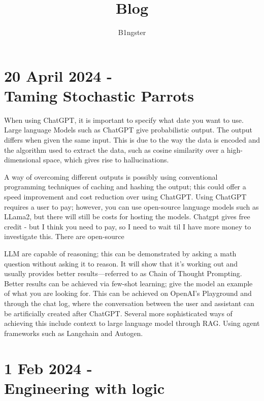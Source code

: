 \documentclass{article}
\title{Blog}
\author{B1ngster}
\date{}
\begin{document}
\maketitle
\newpage


\tableofcontents
\newpage

 



\section*{20 April 2024 - \\ Taming Stochastic Parrots}

When using ChatGPT, it is important to specify what date you want to use. Large language Models such as ChatGPT give probabilistic output. The output differs when given the same input. This is due to the way the data is encoded and the algorithm used to extract the data, such as cosine similarity over a high-dimensional space, which gives rise to hallucinations.  

A way of overcoming different outputs is possibly using conventional programming techniques of caching and hashing the output; this could offer a speed improvement and cost reduction over using ChatGPT. Using ChatGPT requires a user to pay; however, you can use open-source language models such as LLama2, but there will still be costs for hosting the models. Chatgpt gives free credit - but I think you need to pay, so I need to wait til I have more money to investigate this. There are open-source 



LLM are capable of reasoning; this can be demonstrated by asking a math question without asking it to reason. It will show that it's working out and usually provides better results—referred to as Chain of Thought Prompting. Better results can be achieved via few-shot learning; give the model an example of what you are looking for. This can be achieved on OpenAI's Playground and through the chat log, where the conversation between the user and assistant can be artificially created after ChatGPT. Several more sophisticated ways of achieving this include context to large language model through RAG. Using agent frameworks such as Langchain and Autogen. 



\section*{1 Feb 2024 - \\ Engineering with logic}
\end{document}
